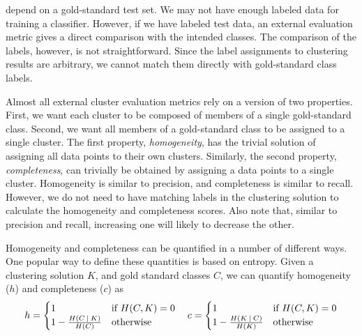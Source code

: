 
 depend on a gold-standard test set.
We may not have enough labeled data for training a classifier.
However, if we have labeled test data,
an external evaluation metric gives a direct comparison
with the intended classes.
The comparison of the labels, however, is not straightforward.
Since the label assignments to clustering results are arbitrary,
we cannot match them directly with gold-standard class labels.

Almost all external cluster evaluation metrics rely on
a version of two properties.%
First,
we want each cluster to be composed of
members of a single gold-standard class.  
Second,
we want all members of a gold-standard class to be assigned to 
a single cluster.
The first property, \emph{homogeneity}, has the trivial solution of
assigning all data points to their own clusters.
Similarly,
the second property, \emph{completeness},
can trivially be obtained by assigning a data points to a single cluster.
Homogeneity is similar to precision,
and completeness is similar to recall.%
However,
we do not need to have matching labels
in the clustering solution to calculate the homogeneity and completeness scores.
Also note that, similar to precision and recall,
increasing one will likely to decrease the other.

Homogeneity and completeness can be quantified in a number of different ways.
One popular way to define these quantities is based on entropy.
Given a clustering solution $K$,
and gold standard classes $C$,
we can quantify homogeneity ($h$) and completeness ($c$) as
\[
  h =  \begin{cases}
    1 & \text{if } H(C,K) = 0 \\
    1 - \frac{H(C\:\vert\:{}K)}{H(C)} & \text{otherwise}\\
  \end{cases}\quad
  c =  \begin{cases}
    1 & \text{if } H(C,K) = 0 \\
    1 - \frac{H(K\:\vert\:{}C)}{H(K)} & \text{otherwise}\\
  \end{cases}
\]


